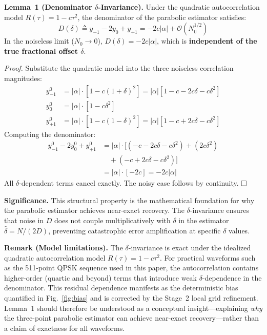 \documentclass[a4paper,fleqn]{cas-dc}
\newcommand{\bigO}{\mathcal{O}}
\begin{document}
\textbf{Lemma~1 (Denominator $\delta$-Invariance).} Under the quadratic autocorrelation model $R(\tau) = 1 - c\tau^2$, the denominator of the parabolic estimator satisfies:
\begin{equation}
D(\delta) \triangleq y_{-1} - 2y_0 + y_{+1} = -2c|\alpha| + \bigO(N_0^{1/2})
\label{eq:denom}
\end{equation}
In the noiseless limit ($N_0 \to 0$), $D(\delta) = -2c|\alpha|$, which is \textbf{independent of the true fractional offset $\delta$}.

\textit{Proof.} Substitute the quadratic model into the three noiseless correlation magnitudes:
\begin{align}
y_{-1}^0 &= |\alpha| \cdot [1 - c(1+\delta)^2] = |\alpha|[1 - c - 2c\delta - c\delta^2] \nonumber\\
y_0^0   &= |\alpha| \cdot [1 - c\delta^2] \nonumber\\
y_{+1}^0 &= |\alpha| \cdot [1 - c(1-\delta)^2] = |\alpha|[1 - c + 2c\delta - c\delta^2] \nonumber
\end{align}
Computing the denominator:
\begin{align}
y_{-1}^0 - 2y_0^0 + y_{+1}^0 &= |\alpha| \cdot [(-c - 2c\delta - c\delta^2) + (2c\delta^2) \nonumber\\
&\quad + (-c + 2c\delta - c\delta^2)] \nonumber\\
&= |\alpha| \cdot [-2c] = -2c|\alpha| \nonumber
\end{align}
All $\delta$-dependent terms cancel exactly. The noisy case follows by continuity. $\hfill\square$

\textbf{Significance.} This structural property is the mathematical foundation for why the parabolic estimator achieves near-exact recovery. The $\delta$-invariance ensures that noise in $D$ does not couple multiplicatively with $\delta$ in the estimator $\hat{\delta} = N/(2D)$, preventing catastrophic error amplification at specific $\delta$ values.

\textbf{Remark (Model limitations).} The $\delta$-invariance is exact under the idealized quadratic autocorrelation model $R(\tau)=1-c\tau^2$. For practical waveforms such as the 511-point QPSK sequence used in this paper, the autocorrelation contains higher-order (quartic and beyond) terms that introduce weak $\delta$-dependence in the denominator. This residual dependence manifests as the deterministic bias quantified in Fig.~\ref{fig:bias} and is corrected by the Stage~2 local grid refinement. Lemma~1 should therefore be understood as a conceptual insight---explaining \emph{why} the three-point parabolic estimator can achieve near-exact recovery---rather than a claim of exactness for all waveforms.
\end{document}

